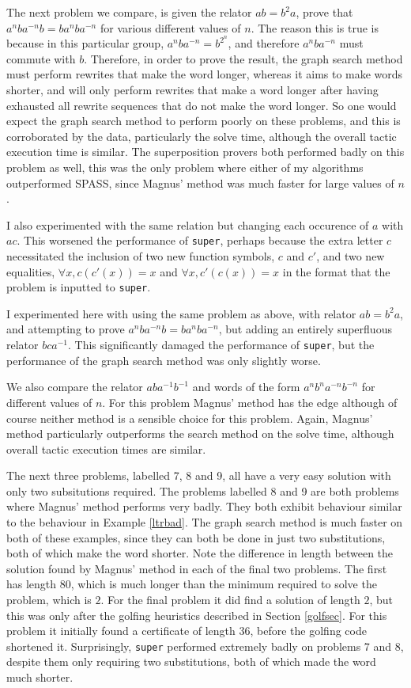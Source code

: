 \documentclass[12pt]{article} %
\theoremstyle{definition}
\theoremstyle{definition}
\theoremstyle{definition}
\theoremstyle{definition}
\theoremstyle{definition}
\theoremstyle{definition}
\begin{document}
The next problem we compare, is given the relator $ab = b^2a$,
prove that $a^nba^{-n}b = ba^nba^{-n}$ for various different values of $n$.
The reason this is true is
because in this particular group, $a^n b a^{-n} = b^{2^n}$, and therefore
$a^n b a^{-n}$ must commute with $b$. Therefore, in order to prove the result,
the graph search method must perform rewrites that make the word longer,
whereas it aims to make words shorter, and will only perform rewrites that
make a word longer after having exhausted all rewrite sequences that
do not make the word longer. So one would expect the graph search method to perform
poorly on these problems, and this is corroborated by the data, particularly the solve time,
although the overall tactic execution time is similar. The superposition provers both performed
badly on this problem as well, this was the only problem where either of my algorithms outperformed
SPASS, since Magnus' method was much faster for large values of $n$.

I also experimented with the same relation but changing each occurence of $a$ with $ac$.
This worsened the performance of \lstinline{super}, perhaps because the extra letter $c$ necessitated the
inclusion of two new function symbols, $c$ and $c'$, and two new equalities,
$\forall x, c (c' (x)) = x$ and $\forall x, c' (c (x)) = x$ in the format that the problem
is inputted to \lstinline{super}.

I experimented here with using the same problem as above, with relator  $ab = b^2a$, and
attempting to prove $a^nba^{-n}b = ba^nba^{-n}$, but adding an entirely superfluous
relator $bca^{-1}$. This significantly damaged the performance of \lstinline{super}, but the performance
of the graph search method was only slightly worse.

We also compare the relator $aba^{-1}b^{-1}$ and words of the form $a^nb^na^{-n}b^{-n}$ for
different values of $n$. For this problem Magnus' method has the edge although of course
neither method is a sensible choice for this problem. Again, Magnus' method particularly
outperforms the search method on the solve time, although overall tactic execution times are
similar.

The next three problems, labelled 7, 8 and 9, all have a very easy solution with only two
subsitutions required. The problems labelled 8 and 9 are both problems where Magnus' method performs
very badly.
They both exhibit behaviour similar to the behaviour in Example \ref{ltrbad}. The graph search
method is much faster on both of these examples, since they can both be done in just two
substitutions, both of which make the word shorter. Note the difference in length between the
solution found by Magnus' method in each of the final two problems. The first has length $80$,
which is much longer than the minimum required to solve the problem, which is $2$.
For the final problem it did find a solution of length $2$, but this was only after the golfing
heuristics described in Section \ref{golfsec}. For this problem it initially found a certificate
of length $36$, before the golfing code shortened it. Surprisingly, \lstinline{super}
performed extremely badly on problems 7 and 8, despite them only requiring two substitutions,
both of which made the word much shorter.
\end{document}
